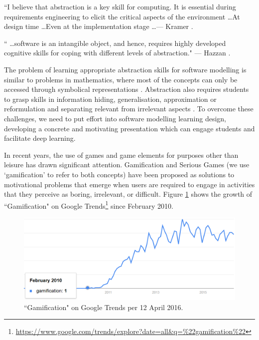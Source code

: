 \documentclass[12pt, a4paper]{report}
\begin{document}
\begin{displayquote}
``I believe that abstraction is a key skill for computing. It is essential during requirements engineering to elicit the critical aspects of the environment \dots At design time \dots Even at the implementation stage \dots --- Kramer \cite{Kramer2007}.
\end{displayquote}

\begin{displayquote}
`` \dots software is an intangible object, and hence, requires highly developed cognitive skills for coping with different levels of abstraction." --- Hazzan \cite{hazzan2008reflections}.
\end{displayquote}

The problem of learning appropriate abstraction skills for software modelling is similar to problems in mathematics, where most of the concepts can only be accessed through symbolical representations \cite{Duval2006}. Abstraction also requires students to grasp skills in information hiding, generalisation, approximation or reformulation and separating relevant from irrelevant aspects \cite{Saitta2013}. To overcome these challenges, we need to put effort into software modelling learning design, developing a concrete and motivating presentation which can engage students and facilitate deep learning.

In recent years, the use of games and game elements for purposes other than leisure has drawn significant attention. Gamification \cite{deterding2011game} and Serious Games \cite{Michael2005} (we use `gamification' to refer to both concepts) have been proposed as solutions to motivational problems that emerge when users are required to engage in activities that they perceive as boring, irrelevant, or difficult. Figure \ref{gamification-trend} shows the growth of ``Gamification" on Google Trends\footnote{\url{https://www.google.com/trends/explore?date=all&q=\%22gamification\%22}} since February 2010. 

\begin{figure}[ht]
\centering
\includegraphics[width=12cm]{gamification-trend}
\caption{``Gamification" on Google Trends per 12 April 2016.}
\label{gamification-trend}
\end{figure}
\end{document}
